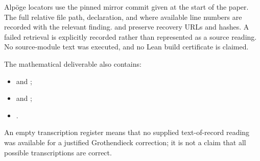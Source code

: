 \documentclass[11pt]{article}
\theoremstyle{definition}\newtheorem{definition}[theorem]{Definition}\newtheorem{remark}[theorem]{Remark}
\begin{document}
Alp\"oge locators use the pinned mirror commit given at the start
of the paper. The full relative file path, declaration, and where
available line numbers are recorded with the relevant finding.
 and
 preserve recovery
URLs and hashes. A failed retrieval is explicitly recorded rather
than represented as a source reading. No source-module text was
executed, and no Lean build certificate is claimed.

The mathematical deliverable also contains:
\begin{itemize}[leftmargin=*]
\item {} and ;
\item {} and ;
\item {}.
\end{itemize}
An empty transcription register means that no
supplied text-of-record reading was available for a justified
Grothendieck correction; it is not a claim that all possible
transcriptions are correct.
\end{document}
